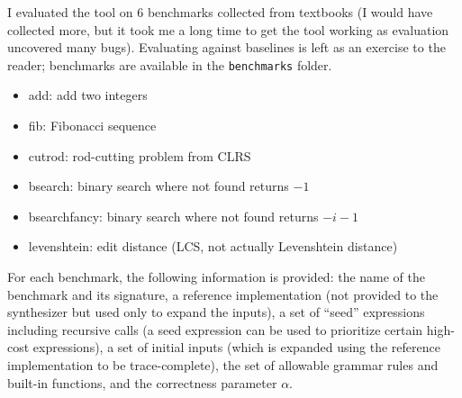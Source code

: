 \documentclass{article}
\begin{document}
I evaluated the tool on 6 benchmarks collected from textbooks
(I would have collected more, but it took me a long time to get
the tool working as evaluation uncovered many bugs).
Evaluating against baselines is left as an exercise to the reader;
benchmarks are available in the \texttt{benchmarks} folder.
\begin{itemize}
    \item add: add two integers
    \item fib: Fibonacci sequence
    \item cut\textunderscore rod: rod-cutting problem from CLRS
    \item bsearch: binary search where not found returns $-1$
    \item bsearch\textunderscore fancy: binary search where not found returns $-i - 1$
    \item levenshtein: edit distance (LCS, not actually Levenshtein distance)
\end{itemize}

For each benchmark, the following information is provided:
the name of the benchmark and its signature,
a reference implementation (not provided to the synthesizer but
used only to expand the inputs),
a set of ``seed'' expressions including recursive calls
(a seed expression can be used to prioritize certain high-cost
expressions),
a set of initial inputs (which is expanded using the reference
implementation to be trace-complete),
the set of allowable grammar rules and built-in functions,
and the correctness parameter $\alpha$.
\end{document}
